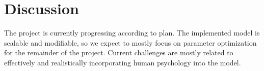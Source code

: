 \documentclass[9pt]{pnas-new}
\begin{document}
\section*{Discussion}

The project is currently progressing according to plan. The implemented model is scalable and modifiable, so we expect to mostly focus on parameter optimization for the remainder of the project. Current challenges are mostly related to effectively and realistically incorporating human psychology into the model. 


\showacknow %


\begin{multicols}{2}
\section*{\bibname}

\end{multicols}
\end{document}
